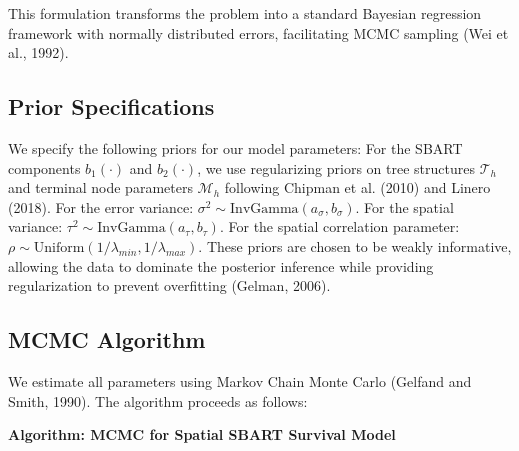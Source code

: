 \documentclass[useAMS,referee]{biom}
\begin{document}
This formulation transforms the problem into a standard Bayesian regression framework with normally distributed errors, facilitating MCMC sampling (Wei et al., 1992).

\subsection{Prior Specifications}

We specify the following priors for our model parameters: For the SBART components $b_1(\cdot)$ and $b_2(\cdot)$, we use regularizing priors on tree structures $\mathcal{T}_h$ and terminal node parameters $\mathcal{M}_h$ following Chipman et al. (2010) and Linero (2018). For the error variance: $\sigma^2 \sim \text{InvGamma}(a_\sigma, b_\sigma)$. For the spatial variance: $\tau^2 \sim \text{InvGamma}(a_\tau, b_\tau)$. For the spatial correlation parameter: $\rho \sim \text{Uniform}(1/\lambda_{min}, 1/\lambda_{max})$. These priors are chosen to be weakly informative, allowing the data to dominate the posterior inference while providing regularization to prevent overfitting (Gelman, 2006).

\subsection{MCMC Algorithm}

We estimate all parameters using Markov Chain Monte Carlo (Gelfand and Smith, 1990). The algorithm proceeds as follows:

\noindent \textbf{Algorithm: MCMC for Spatial SBART Survival Model}
\end{document}
